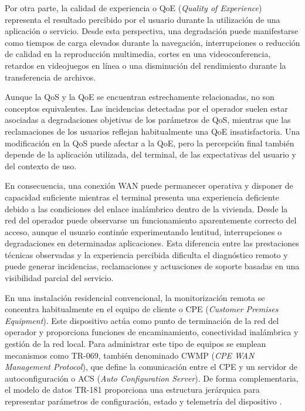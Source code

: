 Por otra parte, la calidad de experiencia o QoE
(\textit{Quality of Experience}) representa el resultado percibido por el
usuario durante la utilización de una aplicación o servicio. Desde esta
perspectiva, una degradación puede manifestarse como tiempos de carga
elevados durante la navegación, interrupciones o reducción de calidad en
la reproducción multimedia, cortes en una videoconferencia, retardos en
videojuegos en línea o una disminución del rendimiento durante la
transferencia de archivos.

Aunque la QoS y la QoE se encuentran estrechamente relacionadas, no son
conceptos equivalentes. Las incidencias detectadas por el operador suelen
estar asociadas a degradaciones objetivas de los parámetros de QoS,
mientras que las reclamaciones de los usuarios reflejan habitualmente una
QoE insatisfactoria. Una modificación en la QoS puede afectar a la QoE,
pero la percepción final también depende de la aplicación utilizada, del
terminal, de las expectativas del usuario y del contexto de uso.

En consecuencia, una conexión WAN puede permanecer operativa y disponer
de capacidad suficiente mientras el terminal presenta una experiencia
deficiente debido a las condiciones del enlace inalámbrico dentro de la
vivienda. Desde la red del operador puede observarse un funcionamiento
aparentemente correcto del acceso, aunque el usuario continúe
experimentando lentitud, interrupciones o degradaciones en determinadas
aplicaciones. Esta diferencia entre las prestaciones técnicas observadas
y la experiencia percibida dificulta el diagnóstico remoto y puede
generar incidencias, reclamaciones y actuaciones de soporte basadas en
una visibilidad parcial del servicio.

En una instalación residencial convencional, la monitorización remota se 
concentra habitualmente en el equipo de cliente o CPE 
(\textit{Customer Premises Equipment}). Este dispositivo actúa como 
punto de terminación de la red del operador y proporciona funciones de
encaminamiento, conectividad inalámbrica y gestión de la red local. 
Para administrar este tipo de equipos se emplean mecanismos como TR-069, 
también denominado CWMP (\textit{CPE WAN Management Protocol}), 
que define la comunicación entre el CPE y un servidor de autoconfiguración 
o ACS (\textit{Auto Configuration Server}). De forma complementaria, 
el modelo de datos TR-181 proporciona una estructura jerárquica para 
representar parámetros de configuración, estado y telemetría del 
dispositivo \cite{bbf_tr069,bbf_tr181}.

